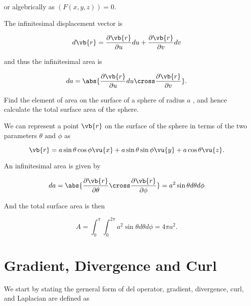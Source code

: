 \documentclass[english,a4paper,12pt]{report}
\begin{document}
or algebrically as \((F(x,y,z)) = 0\). 

The infinitesimal displacement vector is 

\begin{equation}
	d\vb{r} = \frac{\partial \vb{r} }{\partial u} du + \frac{\partial \vb{r} }{\partial v}dv 
\end{equation}

and thus the infinitesimal area is 

\begin{equation}
	da = \abs{\frac{\partial \vb{r} }{\partial u} du \cross \frac{\partial \vb{r} }{\partial v}}.
\end{equation}

{Find the element of area on the surface of a sphere of radius \(a\) , and hence calculate the total surface area of the sphere.}
{We can represent a point \(\vb{r} \)  on the surface of the sphere in terms of the two parameters \(\theta \text { and } \phi \) as

\begin{equation}
	\vb{r} = a \sin \theta \cos \phi \vu{x} + a \sin \theta \sin \phi \vu{y} + a \cos \theta \vu{z} .
\end{equation}

An infinitesimal area is given by 

\begin{equation}
	da = \abs{\frac{\partial \vb{r} }{\partial \theta } \cross \frac{\partial \vb{r} }{\partial \phi } } = a^2\sin \theta d \theta d \phi 
\end{equation}

And the total surface area is then 

\begin{equation}
	A = \int_{0}^{\pi }\int_{0}^{2\pi } a^2 \sin \theta d \theta d \phi = 4\pi a^2.    
\end{equation}
} 












\section{Gradient, Divergence and Curl} 

We start by stating the gerneral form of del operator, gradient, divergence, curl, and Laplacian are defined as
\end{document}
